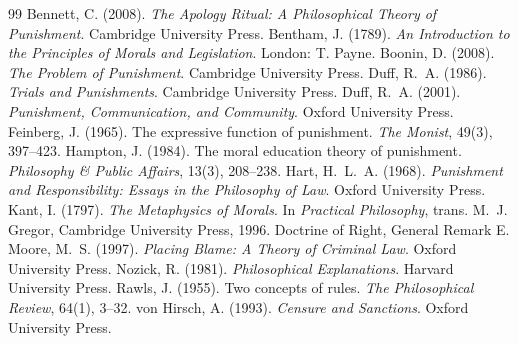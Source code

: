 \documentclass{situationist-preprint}
\begin{document}
\begin{thebibliography}{99}\small
{} Bennett, C. (2008). \emph{The Apology Ritual: A Philosophical Theory of Punishment}. Cambridge University Press.
 Bentham, J. (1789). \emph{An Introduction to the Principles of Morals and Legislation}. London: T. Payne.
 Boonin, D. (2008). \emph{The Problem of Punishment}. Cambridge University Press.
 Duff, R.~A. (1986). \emph{Trials and Punishments}. Cambridge University Press.
 Duff, R.~A. (2001). \emph{Punishment, Communication, and Community}. Oxford University Press.
 Feinberg, J. (1965). The expressive function of punishment. \emph{The Monist}, 49(3), 397--423.
 Hampton, J. (1984). The moral education theory of punishment. \emph{Philosophy \& Public Affairs}, 13(3), 208--238.
 Hart, H.~L.~A. (1968). \emph{Punishment and Responsibility: Essays in the Philosophy of Law}. Oxford University Press.
 Kant, I. (1797). \emph{The Metaphysics of Morals}. In \emph{Practical Philosophy}, trans. M.~J. Gregor, Cambridge University Press, 1996. Doctrine of Right, General Remark E.
 Moore, M.~S. (1997). \emph{Placing Blame: A Theory of Criminal Law}. Oxford University Press.
 Nozick, R. (1981). \emph{Philosophical Explanations}. Harvard University Press.
 Rawls, J. (1955). Two concepts of rules. \emph{The Philosophical Review}, 64(1), 3--32.
 von Hirsch, A. (1993). \emph{Censure and Sanctions}. Oxford University Press.
\end{thebibliography}
\end{document}
